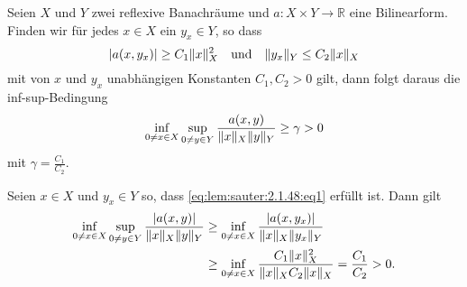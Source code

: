 \begin{Lemma}
\label{lem:sauter:2.1.48}
    Seien $X$ und $Y$ zwei reflexive Banachräume und $a \colon X \times Y \to \mathbb{R}$ eine Bilinearform.
    Finden wir für jedes $x \in X$ ein $y_{x} \in Y$, so dass
    \begin{equation}
        \label{eq:lem:sauter:2.1.48:eq1}
        \lvert a(x, y_{x})\rvert \geq C_{1} \lVert x\rVert_{X}^{2} \quad \text{und} \quad \lVert y_{x}\rVert_{Y} \leq C_{2} \lVert x\rVert_{X}
    \end{equation}
    mit von $x$ und $y_{x}$ unabhängigen Konstanten $C_{1}, C_{2} > 0$ gilt, dann folgt daraus die inf-sup-Bedingung
    \begin{equation}
    \label{eq:lem:sauter:2.1.48:inf_sup}
        \inf_{0 \neq x \in X} \sup_{0 \neq y \in Y} \frac{a(x, y)}{\lVert x\rVert_{X}\lVert y\rVert_{Y}} \geq \gamma > 0
    \end{equation}
    mit $\gamma = \frac{C_{1}}{C_{2}}$.

    \begin{Beweis}
        Seien $x \in X$ und $y_{x} \in Y$ so, dass \cref{eq:lem:sauter:2.1.48:eq1} erfüllt ist.
        Dann gilt
        \begin{align}
            \inf_{0 \neq x \in X} \sup_{0 \neq y \in Y} \frac{\lvert a(x, y)\rvert}{\lVert x\rVert_{X} \lVert y\rVert_{Y}}
            &\geq
            \inf_{0 \neq x \in X} \frac{\lvert a(x, y_{x})\rvert}{\lVert x\rVert_{X} \lVert y_{x}\rVert_{Y}}
            \\&\geq
            \inf_{0 \neq x \in X} \frac{C_{1} \lVert x\rVert^{2}_{X}}{\lVert x\rVert_{X} C_{2} \lVert x\rVert_{X}}
            =
            \frac{C_{1}}{C_{2}}
            > 0.
        \end{align}
    \end{Beweis}
\end{Lemma}

